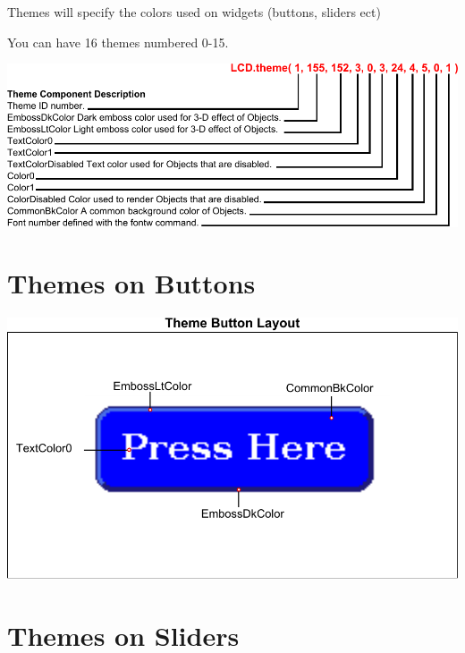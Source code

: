 Themes will specify the colors used on widgets (buttons, sliders ect)\par
 You can have 16 themes numbered 0-\/15. \par
  
\begin{DoxyImageNoCaption}
  \mbox{\includegraphics{themes}}
\end{DoxyImageNoCaption}
 \hypertarget{df/df8/intro_themes_themeButton}{}\section{Themes on Buttons}\label{df/df8/intro_themes_themeButton}
 
\begin{DoxyImageNoCaption}
  \mbox{\includegraphics{themeButton}}
\end{DoxyImageNoCaption}
 \hypertarget{df/df8/intro_themes_themeSlider}{}\section{Themes on Sliders}\label{df/df8/intro_themes_themeSlider}
 
